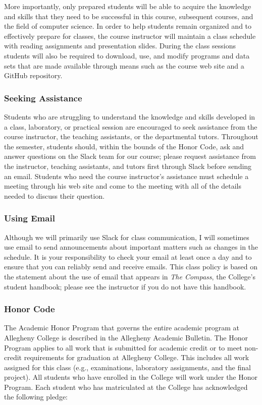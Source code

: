\documentclass[11pt]{article}
\newcommand{\instructorpronoun}[1]{his}
\begin{document}
More importantly, only prepared students will be able to acquire the knowledge and skills that they need to be
successful in this course, subsequent courses, and the field of computer science. In order to help students remain
organized and to effectively prepare for classes, the course instructor will maintain a class schedule with reading
assignments and presentation slides. During the class sessions students will also be required to download, use, and
modify programs and data sets that are made available through means such as the course web site and a GitHub repository.

\subsubsection*{Seeking Assistance}

Students who are struggling to understand the knowledge and skills developed in a class, laboratory, or practical
session are encouraged to seek assistance from the course instructor, the teaching assistants, or the departmental
tutors. Throughout the semester, students should, within the bounds of the Honor Code, ask and answer questions on the
Slack team for our course; please request assistance from the instructor, teaching assistants, and tutors first through
Slack before sending an email. Students who need the course instructor's assistance must schedule a meeting through
\instructorpronoun{} web site and come to the meeting with all of the details needed to discuss their question.

\subsubsection*{Using Email}

Although we will primarily use Slack for class communication, I will sometimes use email to send announcements about
important matters such as changes in the schedule. It is your responsibility to check your email at least once a day and
to ensure that you can reliably send and receive emails. This class policy is based on the statement about the use of
email that appears in {\em The Compass}, the College's student handbook; please see the instructor if you do not have
this handbook.

\subsubsection*{Honor Code}

The Academic Honor Program that governs the entire academic program at Allegheny College is described in the Allegheny
Academic Bulletin. The Honor Program applies to all work that is submitted for academic credit or to meet non-credit
requirements for graduation at Allegheny College. This includes all work assigned for this class (e.g., examinations,
laboratory assignments, and the final project). All students who have enrolled in the College will work under the Honor
Program. Each student who has matriculated at the College has acknowledged the following pledge:
\end{document}
